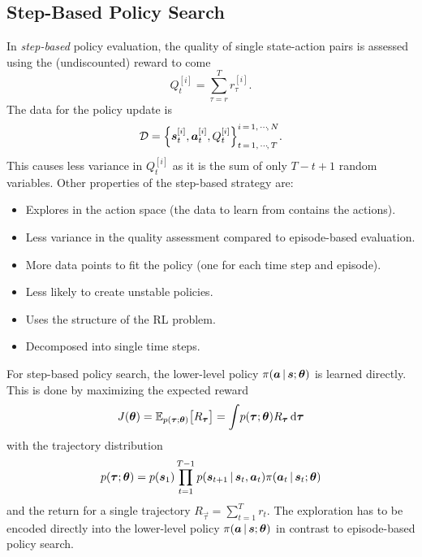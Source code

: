		\subsection{Step-Based Policy Search}
			In \emph{step-based} policy evaluation, the quality of single state-action pairs is assessed using the (undiscounted) reward to come
			\begin{equation}
			Q_t^{[i]} = \sum_{\tau = r}^{T} r_\tau^{[i]}.  \label{eq:policyGradientRewardToCome}
			\end{equation}
			The data for the policy update is
			\begin{equation*}
			\mathcal{D} = \Big\{ \bm{s}_t^{[i]}, \bm{a}_t^{[i]}, Q_t^{[i]} \Big\}_{t \,=\, 1,\,\cdots\!,\,T}^{i \,=\, 1,\,\cdots\!,\,N}.
			\end{equation*}
			This causes less variance in \( Q_t^{[i]} \) as it is the sum of only \( T - t + 1 \) random variables. Other properties of the step-based strategy are:
			\begin{itemize}
				\item Explores in the action space (the data to learn from contains the actions).
				\item Less variance in the quality assessment compared to episode-based evaluation.
				\item More data points to fit the policy (one for each time step and episode).
				\item Less likely to create unstable policies.
				\item Uses the structure of the RL problem.
				\item Decomposed into single time steps.
			\end{itemize}

			For step-based policy search, the lower-level policy \( \pi(\bm{a} \,\vert\, \bm{s}; \bm{\theta}) \) is learned directly. This is done by maximizing the expected reward
			\begin{equation}
				J(\bm{\theta})
					= \mathbb{E}_{p(\bm{\tau}; \bm{\theta})}\big[ R_{\bm{\tau}} \big]
					= \int\! p(\bm{\tau}; \bm{\theta}) R_{\bm{\tau}} \dd{\bm{\tau}}  \label{eq:policyGradientStepBasedObjective}
			\end{equation}
			with the trajectory distribution
			\begin{equation}
				p(\bm{\tau}; \bm{\theta}) = p(\bm{s}_1) \prod_{t = 1}^{T - 1} p(\bm{s}_{t + 1} \,\vert\, \bm{s}_t, \bm{a}_t) \pi(\bm{a}_t \,\vert\, \bm{s}_t; \bm{\theta})  \label{eq:policyGradientTrajectoryDistribution}
			\end{equation}
			and the return for a single trajectory \( R_{\vec{\tau}} = \sum_{t = 1}^{T} r_t \). The exploration has to be encoded directly into the lower-level policy \( \pi(\bm{a} \,\vert\, \bm{s}; \bm{\theta}) \) in contrast to episode-based policy search.

